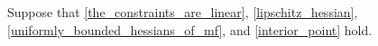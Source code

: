 Suppose that \cref{the_constraints_are_linear}, \cref{lipschitz_hessian}, \cref{uniformly_bounded_hessians_of_mf}, and \cref{interior_point} hold.
